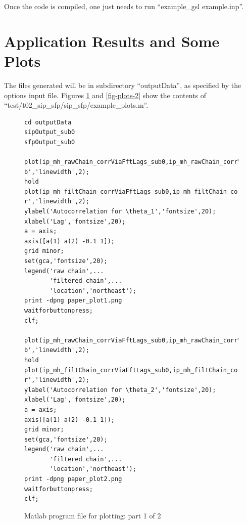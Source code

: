 Once the code is compiled, one just needs to run ``example\_gsl example.inp''.

\clearpage
\section{Application Results and Some Plots}\label{sc-appl-plots}

The files generated will be in subdirectory ``outputData'', as specified by the options input file.
Figures \ref{fig-plots-1} and \ref{fig-plots-2} show the contents of ``test/t02\_sip\_sfp/sip\_sfp/example\_plots.m''.

\begin{figure}[h!]
\begin{center}
\begin{verbatim}
cd outputData
sipOutput_sub0
sfpOutput_sub0

plot(ip_mh_rawChain_corrViaFftLags_sub0,ip_mh_rawChain_corrViaFftInitPos0_sub0(1,:),'-b','linewidth',2);
hold
plot(ip_mh_filtChain_corrViaFftLags_sub0,ip_mh_filtChain_corrViaFftInitPos0_sub0(1,:),'-r','linewidth',2);
ylabel('Autocorrelation for \theta_1','fontsize',20);
xlabel('Lag','fontsize',20);
a = axis;
axis([a(1) a(2) -0.1 1]);
grid minor;
set(gca,'fontsize',20);
legend('raw chain',...
       'filtered chain',...
       'location','northeast');
print -dpng paper_plot1.png
waitforbuttonpress;
clf;

plot(ip_mh_rawChain_corrViaFftLags_sub0,ip_mh_rawChain_corrViaFftInitPos0_sub0(2,:),'-b','linewidth',2);
hold
plot(ip_mh_filtChain_corrViaFftLags_sub0,ip_mh_filtChain_corrViaFftInitPos0_sub0(2,:),'-r','linewidth',2);
ylabel('Autocorrelation for \theta_2','fontsize',20);
xlabel('Lag','fontsize',20);
a = axis;
axis([a(1) a(2) -0.1 1]);
grid minor;
set(gca,'fontsize',20);
legend('raw chain',...
       'filtered chain',...
       'location','northeast');
print -dpng paper_plot2.png
waitforbuttonpress;
clf;
\end{verbatim}
\end{center}
\caption{
Matlab program file for plotting: part 1 of 2
}
\label{fig-plots-1}
\end{figure}

